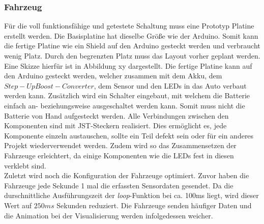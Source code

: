\documentclass[.../Dokumentation.tex]{subfiles}
\begin{document}
    \subsubsection*{Fahrzeug}
    Für die voll funktionsfähige und getestete Schaltung muss eine Prototyp Platine erstellt werden. Die Basisplatine hat dieselbe Größe wie der Arduino. Somit kann die fertige Platine wie ein Shield auf den Arduino gesteckt werden und verbraucht wenig Platz. Durch den begrenzten Platz muss das Layout vorher geplant werden. Eine Skizze hierfür ist in Abbildung xy dargestellt. %
    Die fertige Platine kann auf den Arduino gesteckt werden, welcher zusammen mit dem Akku, dem $Step-Up Boost-Converter$, dem Sensor und den LEDs in das Auto verbaut werden kann. Zusätzlich wird ein Schalter eingebaut, mit welchem die Batterie einfach an- beziehungsweise ausgeschaltet werden kann. Somit muss nicht die Batterie von Hand aufgesteckt werden.
    Alle Verbindungen zwischen den Komponenten sind mit JST-Steckern realisiert. Dies ermöglicht es, jede Komponente einzeln austauschen, sollte ein Teil defekt sein oder für ein anderes Projekt wiederverwendet werden. Zudem wird so das Zusammensetzen der Fahrzeuge erleichtert, da einige Komponenten wie die LEDs fest in diesen verklebt sind.\\
    Zuletzt wird noch die Konfiguration der Fahrzeuge optimiert. Zuvor haben die Fahrzeuge jede Sekunde 1 mal die erfassten Sensordaten gesendet. Da die durschnittliche Ausführungszeit der \emph{loop}-Funktion bei ca. 100ms liegt, wird dieser Wert auf $250ms$ Sekunden reduziert. Die Fahrzeuge senden häufiger Daten und die Animation bei der Visualisierung werden infolgedessen weicher.
    
\end{document}
